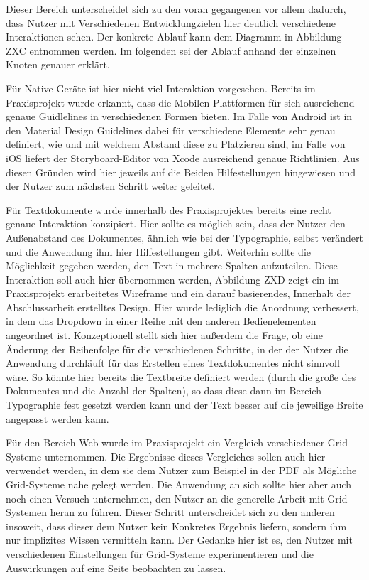 Dieser Bereich unterscheidet sich zu den voran gegangenen vor allem dadurch, dass Nutzer mit Verschiedenen Entwicklungzielen hier deutlich verschiedene Interaktionen sehen. Der konkrete Ablauf kann dem Diagramm in Abbildung ZXC entnommen werden. Im folgenden sei der Ablauf anhand der einzelnen Knoten genauer erklärt.

Für Native Geräte ist hier nicht viel Interaktion vorgesehen. Bereits im Praxisprojekt wurde erkannt, dass die Mobilen Plattformen für sich ausreichend genaue Guidlelines in verschiedenen Formen bieten. Im Falle von Android ist in den Material Design Guidelines dabei für verschiedene Elemente sehr genau definiert, wie und mit welchem Abstand diese zu Platzieren sind, im Falle von iOS liefert der Storyboard-Editor von Xcode ausreichend genaue Richtlinien.
Aus diesen Gründen wird hier jeweils auf die Beiden Hilfestellungen hingewiesen und der Nutzer zum nächsten Schritt weiter geleitet.

Für Textdokumente wurde innerhalb des Praxisprojektes bereits eine recht genaue Interaktion konzipiert. Hier sollte es möglich sein, dass der Nutzer den Außenabstand des Dokumentes, ähnlich wie bei der Typographie, selbst verändert und die Anwendung ihm hier Hilfestellungen gibt. Weiterhin sollte die Möglichkeit gegeben werden, den Text in mehrere Spalten aufzuteilen. Diese Interaktion soll auch hier übernommen werden, Abbildung ZXD zeigt ein im Praxisprojekt erarbeitetes Wireframe und ein darauf basierendes, Innerhalt der Abschlussarbeit erstelltes Design.
Hier wurde lediglich die Anordnung verbessert, in dem das Dropdown in einer Reihe mit den anderen Bedienelementen angeordnet ist.
Konzeptionell stellt sich hier außerdem die Frage, ob eine Änderung der Reihenfolge für die verschiedenen Schritte, in der der Nutzer die Anwendung durchläuft für das Erstellen eines Textdokumentes nicht sinnvoll wäre. So könnte hier bereits die Textbreite definiert werden (durch die große des Dokumentes und die Anzahl der Spalten), so dass diese dann im Bereich Typographie fest gesetzt werden kann und der Text besser auf die jeweilige Breite angepasst werden kann.

Für den Bereich Web wurde im Praxisprojekt ein Vergleich verschiedener Grid-Systeme unternommen. Die Ergebnisse dieses Vergleiches sollen auch hier verwendet werden, in dem sie dem Nutzer zum Beispiel in der PDF als Mögliche Grid-Systeme nahe gelegt werden.
Die Anwendung an sich sollte hier aber auch noch einen Versuch unternehmen, den Nutzer an die generelle Arbeit mit Grid-Systemen heran zu führen. Dieser Schritt unterscheidet sich zu den anderen insoweit, dass dieser dem Nutzer kein Konkretes Ergebnis liefern, sondern ihm nur implizites Wissen vermitteln kann.
Der Gedanke hier ist es, den Nutzer mit verschiedenen Einstellungen für Grid-Systeme experimentieren und die Auswirkungen auf eine Seite beobachten zu lassen.

